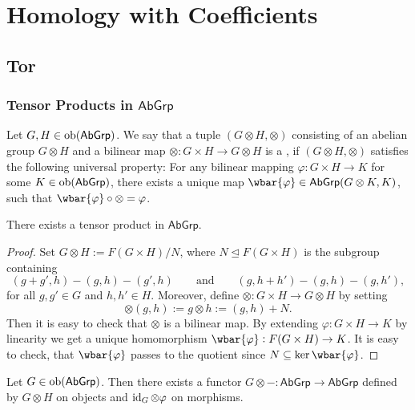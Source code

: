 \chapter{Homology with Coefficients}
\section*{Tor}
\subsection*{Tensor Products in $\mathsf{AbGrp}$}

\begin{definition}
	Let $G,H \in \operatorname{ob}(\mathsf{AbGrp})$. We say that a tuple $(G \otimes H,\otimes)$ consisting of an abelian group $G \otimes H$ and a bilinear map $\otimes : G \times H \to G \otimes H$ is a , if $(G \otimes H,\otimes)$ satisfies the following universal property: For any bilinear mapping $\varphi : G \times H \to K$ for some $K \in \operatorname{ob}(\mathsf{AbGrp})$, there exists a unique map $\wbar{\varphi} \in \mathsf{AbGrp}(G \otimes K,K)$, such that $\wbar{\varphi} \circ \otimes = \varphi$.
\end{definition}

\begin{proposition}
	There exists a tensor product in $\mathsf{AbGrp}$.
\end{proposition}

\begin{proof}
	Set $G \otimes H := F(G \times H)/N$, where $N \unlhd F(G \times H)$ is the subgroup containing 
	\begin{equation*}
		(g + g',h) - (g,h) - (g',h) \qquad \text{and} \qquad (g,h + h') - (g,h) - (g,h'),
	\end{equation*}
	\noindent for all $g,g' \in G$ and $h, h' \in H$. Moreover, define $\otimes : G \times H \to G \otimes H$ by setting
	\begin{equation*}
		\otimes(g,h) := g \otimes h := (g,h) + N.
	\end{equation*}
	Then it is easy to check that $\otimes$ is a bilinear map. By extending $\varphi : G \times H \to K$ by linearity we get a unique homomorphism $\wbar{\varphi} : F(G \times H) \to K$. It is easy to check, that $\wbar{\varphi}$ passes to the quotient since $N \subseteq \ker \wbar{\varphi}$. 
\end{proof}

Let $G \in \operatorname{ob}(\mathsf{AbGrp})$. Then there exists a functor $G \otimes - : \mathsf{AbGrp} \to \mathsf{AbGrp}$ defined by $G \otimes H$ on objects and $\operatorname{id}_G \otimes \varphi$ on morphisms. 

